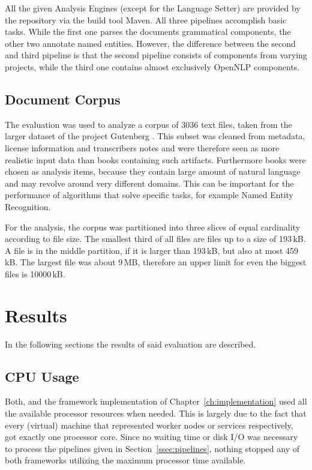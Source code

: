 \begin{itemize}
\begin{enumerate}
	\end{enumerate}
	
\end{itemize}
All the given Analysis Engines (except for the Language Setter) are provided by the \dkpro{} repository via the build tool Maven. All three pipelines accomplish basic \nlp{} tasks. While the first one parses the documents grammatical components, the other two annotate named entities. However, the difference between the second and third pipeline is that the second pipeline consists of components from varying projects, while the third one contains almost exclusively OpenNLP components.

\subsection{Document Corpus}
The evaluation was used to analyze a corpus of 3036 text files, taken from the larger dataset of the project Gutenberg \cite{lahiri:2014:SRW}. This subset was cleaned from metadata, license information and transcribers notes and were therefore seen as more realistic input data than books containing such artifacts. Furthermore books were chosen as analysis items, because they contain large amount of natural language and may revolve around very different domains. This can be important for the performance of algorithms that solve specific \nlp{} tasks, for example Named Entity Recognition. 

For the analysis, the corpus was partitioned into three slices of equal cardinality according to file size. The smallest third of all files are files up to a size of 193\,kB. A file is in the middle partition, if it is larger than 193\,kB, but also at most 459\,kB. The largest file was about 9\,MB, therefore an upper limit for even the biggest files is 10000\,kB.
\section{Results}

In the following sections the results of said evaluation are described.

\subsection{CPU Usage}
Both, \uimaas{} and the framework implementation of Chapter~\ref{ch:implementation} used all the available processor resources when needed. This is largely due to the fact that every (virtual) machine that represented worker nodes or services respectively, got exactly one processor core. Since no waiting time or disk I/O was necessary to process the pipelines given in Section~\ref{ssec:pipelines}, nothing stopped any of both frameworks utilizing the maximum processor time available.

